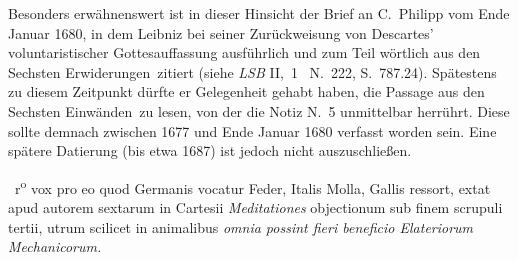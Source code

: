 \begin{ledgroup}
Besonders erwähnenswert ist in dieser Hinsicht der Brief an C.~Philipp vom Ende Januar 1680,%
\protect{}
in dem Leibniz bei seiner Zurückweisung von Descartes' voluntaristischer Gottesauffassung ausführlich und zum Teil wörtlich aus den \glqq Sechsten Erwiderungen\grqq\ zitiert (siehe \textit{LSB} II,~1 \rbrack\ N.~222, S.~787.24\cite{01316}). %
Spätestens zu diesem Zeitpunkt dürfte er Gelegenheit gehabt haben, die Passage aus den \glqq Sechsten Einwänden\grqq\ zu lesen, von der die Notiz N.~5 unmittelbar herrührt.
Diese sollte demnach zwischen 1677 und Ende Januar 1680 verfasst worden sein.
Eine spätere Datierung (bis etwa 1687) ist jedoch nicht auszuschließen.%
\protect{}
\pend
\end{ledgroup}
%
\frenchspacing%
%
\newpage%
%
\count{}
\count{}
\count{}
%
%
\pstart
\noindent
{}~r\textsuperscript{o}\rbrack%
\protect{}%
vox pro eo
quod Germanis\protect{} vocatur Feder,\protect{}
Italis\protect{} Molla,\protect{}
Gallis\protect{} ressort,\protect{}
%
%
%
extat apud autorem sextarum
in Cartesii\protect{}
\textit{Meditationes} objectionum sub finem scrupuli\protect{} tertii,
utrum scilicet in animalibus\protect{}
\textit{omnia possint fieri beneficio Elateriorum Mechanicorum.}%
\protect{}
%
\pend
